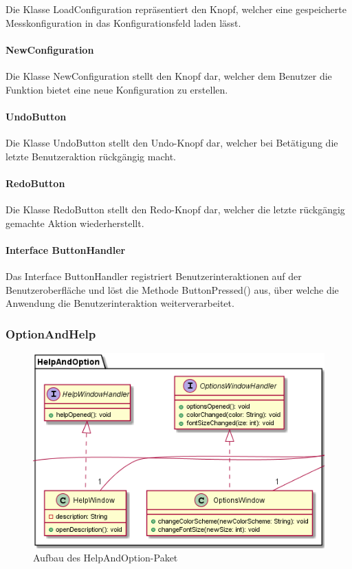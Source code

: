 \documentclass[parskip=full]{scrartcl}
\begin{document}
Die Klasse LoadConfiguration repräsentiert den Knopf, welcher eine gespeicherte Messkonfiguration in das Konfigurationsfeld laden lässt.

\paragraph{NewConfiguration}

Die Klasse NewConfiguration stellt den Knopf dar, welcher dem Benutzer die Funktion bietet eine neue Konfiguration zu erstellen.

\paragraph{UndoButton}

Die Klasse UndoButton stellt den Undo-Knopf dar, welcher bei Betätigung die letzte Benutzeraktion rückgängig macht.

\paragraph{RedoButton}

Die Klasse RedoButton stellt den Redo-Knopf dar, welcher die letzte rückgängig gemachte Aktion wiederherstellt.

\paragraph{Interface ButtonHandler}

Das Interface ButtonHandler registriert Benutzerinteraktionen auf der Benutzeroberfläche und löst die Methode ButtonPressed() aus, über welche die Anwendung die Benutzerinteraktion weiterverarbeitet.

\subsubsection{OptionAndHelp}

\begin{figure}[htbp]
	\begin{center}
		\includegraphics[width = 14cm]{Grafiken/View/HelpAndOptionNamespace.PNG}
		\caption{Aufbau des HelpAndOption-Paket}
		\label{Entwurf_Grob}
	\end{center}
\end{figure}
\end{document}
